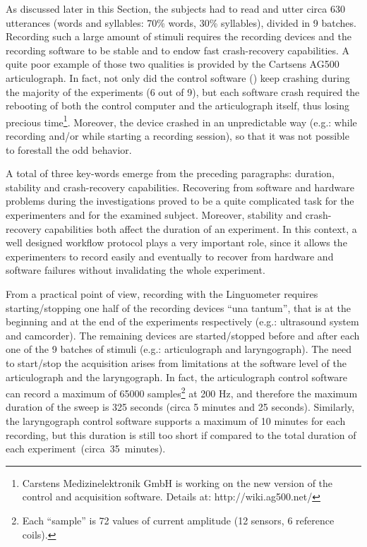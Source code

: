 As discussed later in this Section, the subjects had to read and utter circa 630
utterances (words and syllables: 70\% words, 30\% syllables), divided in 9 batches.
Recording such a large amount of stimuli requires the recording devices and
the recording software to be stable and to endow fast crash-recovery
capabilities.
A quite poor example of those two qualities is provided by the Cartsens AG500
articulograph. 
In fact, not only did the control software () 
keep crashing during the majority of the experiments (6 out of 9), but each 
software crash required the rebooting of both the control computer and the 
articulograph itself, thus losing precious time\footnote{Carstens 
Medizinelektronik GmbH is working on the new version of
the control and acquisition software. Details at: http://wiki.ag500.net/}. 
Moreover, the device crashed in an unpredictable
way (e.g.: while recording and/or while starting a recording session), so that
it was not possible to forestall the odd behavior.

A total of three key-words emerge from the preceding paragraphs: 
duration, stability and crash-recovery capabilities.
Recovering from software and hardware problems during the investigations proved
to be a quite complicated task for the experimenters and for the examined
subject.
Moreover, stability and crash-recovery capabilities both affect the duration
of an experiment. 
In this context, a well designed workflow protocol plays a very important role,
since it allows the experimenters to record easily and eventually to recover
from hardware and software failures without invalidating the whole experiment.

From a practical point of view, recording with the Linguometer requires
starting/stopping one half of the recording devices ``una tantum'', that is at
the beginning and at the end of the experiments respectively (e.g.: ultrasound 
system and
camcorder).
The remaining devices are started/stopped before and after each one of the 9
batches of stimuli (e.g.: articulograph and laryngograph).
The need to start/stop the acquisition arises from limitations at the
software level of the articulograph and the laryngograph.
In fact, the articulograph control software can record a maximum of 65000 
samples\footnote{Each ``sample'' is  72 values of current
amplitude (12 sensors, 6 reference coils).} at 200 Hz, and 
therefore the maximum
duration of the sweep is 325 seconds (circa 5 minutes and 25 seconds).
Similarly, the laryngograph control software supports a maximum of 10 minutes
for each recording, but this duration is still too short if compared to the
total duration of each experiment~(circa~35~minutes).

